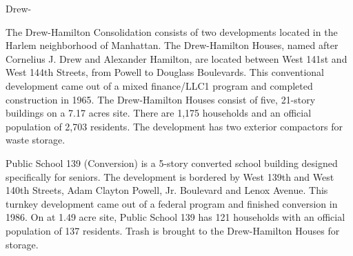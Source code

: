 Drew-\par \vspace{.7\baselineskip}The Drew-Hamilton Consolidation consists of two developments located in the Harlem neighborhood of Manhattan. The Drew-Hamilton Houses, named after Cornelius J. Drew and Alexander Hamilton, are located between West 141st and West 144th Streets, from Powell to Douglass Boulevards. This conventional development came out of a mixed finance/LLC1 program and completed construction in 1965. The Drew-Hamilton Houses consist of five, 21-story buildings on a 7.17 acres site. There are 1,175 households and an official population of 2,703 residents. The development has two exterior compactors for waste storage.\par \vspace{.7\baselineskip}Public School 139 (Conversion) is a 5-story converted school building designed specifically for seniors. The development is bordered by West 139th and West 140th  Streets, Adam Clayton Powell, Jr. Boulevard and Lenox Avenue. This turnkey development came out of a federal program and finished conversion in 1986. On at 1.49 acre site, Public School 139 has 121 households with an official population of 137 residents. Trash is brought to the Drew-Hamilton Houses for storage.